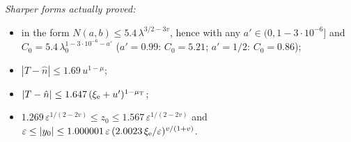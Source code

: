 \begin{theorem}
\begin{itemize}
\end{itemize}
\emph{Sharper forms actually proved:}
\begin{itemize}
\item[\textup{(T1)}] in the form $N(a,b)\le5.4\,\lambda^{3/2-3v}$, hence with any $a'\in(0,1-3\cdot10^{-6}]$ and
$C_0=5.4\,\lambda_0^{1-3\cdot10^{-6}-a'}$ ($a'=0.99$: $C_0=5.21$; $a'=1/2$: $C_0=0.86$);
\item[\textup{(T3)}] $|T-\hat n|\le1.69\,u^{1-\mu}$;
\item[\textup{(T4)}] $|T-\hat n|\le1.647\,(\xi_{\mathrm e}+u')^{1-\mu_{\mathrm T}}$;
\item[\textup{(T5)}] $1.269\,\varepsilon^{1/(2-2v)}\le z_0\le1.567\,\varepsilon^{1/(2-2v)}$ and
$\varepsilon\le|y_0|\le1.000001\,\varepsilon\,(2.0023\,\xi_{\mathrm e}/\varepsilon)^{v/(1+v)}$.
\end{itemize}
\end{theorem}
